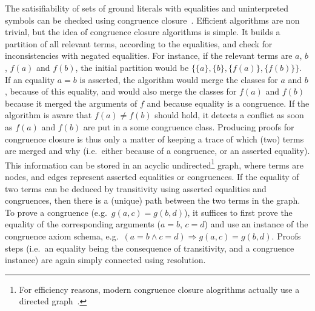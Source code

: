 \documentclass{llncs}
\begin{document}
The satisifiability of sets of ground literals with equalities and uninterpreted
symbols can be checked using congruence
closure~\cite{Nelson2,Nieuwenhuis3,Nieuwenhuis6}.  Efficient algorithms are non
trivial, but the idea of congruence closure algorithms is simple.  It builds a
partition of all relevant terms, according to the equalities, and check for
inconsistencies with negated equalities.  For instance, if the relevant terms
are $a$, $b$, $f(a)$ and $f(b)$, the initial partition would be $\big\{\{a\},
\{b\}, \{f(a)\}, \{f(b)\}\big\}$.  If an equality $a=b$ is asserted, the
algorithm would merge the classes for $a$ and $b$, because of this equality, and
would also merge the classes for $f(a)$ and $f(b)$ because it merged the
arguments of $f$ and because equality is a congruence.  If the algorithm is
aware that $f(a) \neq f(b)$ should hold, it detects a conflict as soon as $f(a)$
and $f(b)$ are put in a some congruence class.  Producing proofs for congruence
closure is thus only a matter of keeping a trace of which (two) terms are merged
and why (i.e.\ either because of a congruence, or an asserted equality).  This
information can be stored in an acyclic undirected\footnote{For efficiency
  reasons, modern congruence closure alogrithms actually use a directed
  graph~\cite{Nieuwenhuis6}.} graph, where terms are nodes, and edges represent
asserted equalities or congruences.  If the equality of two terms can be deduced
by transitivity using asserted equalities and congruences, then there is a
(unique) path between the two terms in the graph.  To prove a congruence
(e.g.\ $g(a,c) = g(b,d)$), it suffices to first prove the equality of the
corresponding arguments ($a=b$, $c=d$) and use an instance of the congruence
axiom schema, e.g.\ $(a=b \wedge c=d) \Rightarrow g(a,c) = g(b,d)$.  Proofs
steps (i.e.\ an equality being the consequence of transitivity, and a congruence
instance) are again simply connected using resolution.
\end{document}
